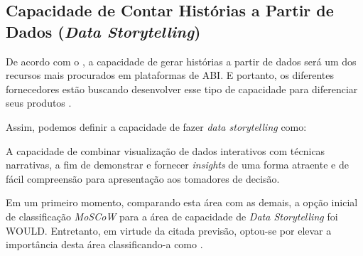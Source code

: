 \subsection{Capacidade de Contar Histórias a Partir de Dados (\emph{Data Storytelling})}
\label{sub-storytelling}

De acordo com o \relGMQ \xspace \cite{gartner:magicquadrant}, a capacidade de gerar histórias a partir de dados será um dos recursos mais procurados em plataformas de ABI. E portanto, os diferentes fornecedores estão buscando desenvolver esse tipo de capacidade para diferenciar seus produtos \cite[6]{analisegartner2020}.

Assim, podemos definir a capacidade de fazer \emph{data storytelling} como:

\begin{definition}
    A capacidade de combinar visualização de dados interativos com técnicas narrativas, a fim de demonstrar e fornecer \emph{insights} de uma forma atraente e de fácil compreensão para apresentação aos tomadores de decisão.
\end{definition}



Em um primeiro momento, comparando esta área com as demais, a opção inicial de classificação \emph{MoSCoW} para a área de capacidade de \emph{Data Storytelling} foi WOULD. Entretanto, em virtude da citada previsão, optou-se por elevar a importância desta área classificando-a como \COULD.
